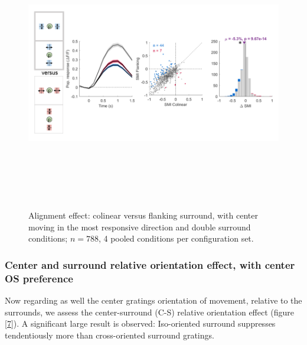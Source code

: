 \begin{figure}[H] \centering \includegraphics[width=12cm,height=12cm,keepaspectratio]{Figures/7.Results/finalPopulation/sel/diagrams/6.png} 
\caption{Alignment effect: colinear versus flanking surround, with center moving in the most responsive direction and double surround conditions;  $n=788$, 4 pooled conditions per configuration set.} 
\label{6}
\end{figure}

\subsubsection{Center and surround relative orientation effect, with center OS preference}

Now regarding as well the center gratings orientation of movement, relative to the surrounds, we assess the center-surround (C-S) relative orientation effect (figure \ref{7}). A significant large result is observed: Iso-oriented surround suppresses tendentiously more than cross-oriented surround gratings.

